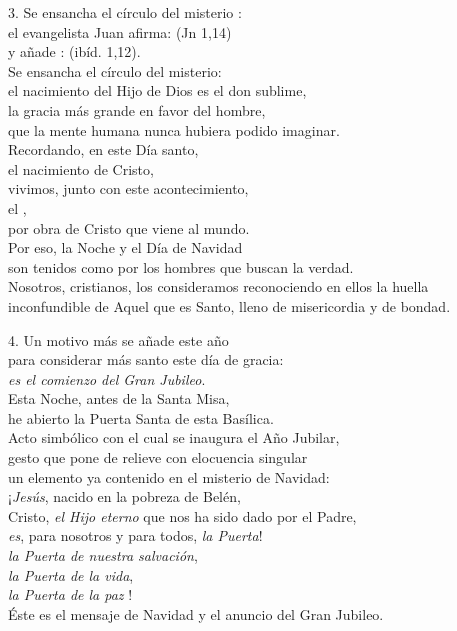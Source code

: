 3. Se ensancha el círculo del misterio :\\ el evangelista Juan afirma:  (Jn 1,14)\\ y añade :  (ibíd. 1,12).\\ Se ensancha el círculo del misterio:\\ el nacimiento del Hijo de Dios es el don sublime,\\ la gracia más grande en favor del hombre,\\ que la mente humana nunca hubiera podido imaginar.\\ Recordando, en este Día santo,\\ el nacimiento de Cristo,\\ vivimos, junto con este acontecimiento,\\ el ,\\ por obra de Cristo que viene al mundo.\\ Por eso, la Noche y el Día de Navidad\\ son tenidos como  por los hombres que buscan la verdad.\\ Nosotros, cristianos, los consideramos  reconociendo en ellos la huella inconfundible de Aquel que es Santo, lleno de misericordia y de bondad.

4. Un motivo más se añade este año\\ para considerar más santo este día de gracia:\emph{\\ es el comienzo del Gran Jubileo}.\\ Esta Noche, antes de la Santa Misa,\\ he abierto la Puerta Santa de esta Basílica.\\ Acto simbólico con el cual se inaugura el Año Jubilar,\\ gesto que pone de relieve con elocuencia singular\\ un elemento ya contenido en el misterio de Navidad:\\ ¡\emph{Jesús}, nacido en la pobreza de Belén,\\ Cristo, \emph{el Hijo eterno} que nos ha sido dado por el Padre,\emph{\\ es}, para nosotros y para todos, \emph{la Puerta}!\emph{\\ la Puerta de nuestra salvación},\emph{\\ la Puerta de la vida},\emph{\\ la Puerta de la paz} !\\ Éste es el mensaje de Navidad y el anuncio del Gran Jubileo.

